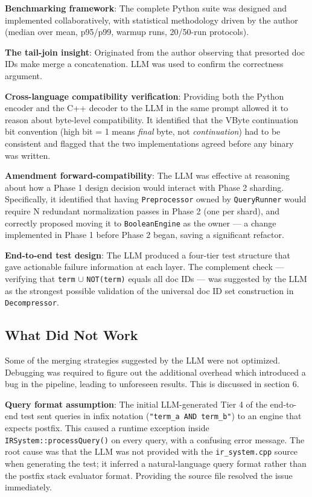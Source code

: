 \documentclass[twocolumn, 10pt]{article}
\begin{document}
\textbf{Benchmarking framework}: The complete Python suite was designed
and implemented collaboratively, with statistical methodology driven by the
author (median over mean, p95/p99, warmup runs, 20/50-run protocols).

\textbf{The tail-join insight}: Originated from the author observing that
presorted doc IDs make merge a concatenation. LLM was used to confirm the
correctness argument.

\textbf{Cross-language compatibility verification}: Providing both the
Python encoder and the C++ decoder to the LLM in the same prompt allowed it
to reason about byte-level compatibility. It identified that the VByte
continuation bit convention (high bit = 1 means \textit{final} byte, not
\textit{continuation}) had to be consistent and flagged that the two
implementations agreed before any binary was written.

\textbf{Amendment forward-compatibility}: The LLM was effective at
reasoning about how a Phase 1 design decision would interact with Phase 2
sharding. Specifically, it identified that having \texttt{Preprocessor}
owned by \texttt{QueryRunner} would require N redundant normalization passes
in Phase 2 (one per shard), and correctly proposed moving it to
\texttt{BooleanEngine} as the owner --- a change implemented in Phase 1
before Phase 2 began, saving a significant refactor.

\textbf{End-to-end test design}: The LLM produced a four-tier test
structure that gave actionable failure information at each layer. The
complement check --- verifying that \texttt{term} $\cup$
\texttt{NOT(term)} equals all doc IDs --- was suggested by the LLM as
the strongest possible validation of the universal doc ID set construction
in \texttt{Decompressor}.

\subsection{What Did Not Work}

Some of the merging strategies suggested by the LLM were not optimized.
Debugging was required to figure out the additional overhead which introduced
a bug in the pipeline, leading to unforeseen results. This is discussed in
section 6.

\textbf{Query format assumption}: The initial LLM-generated Tier 4 of the
end-to-end test sent queries in infix notation (\texttt{"term\_a AND term\_b"})
to an engine that expects postfix. This caused a runtime exception inside
\texttt{IRSystem::processQuery()} on every query, with a confusing error
message. The root cause was that the LLM was not provided with the
\texttt{ir\_system.cpp} source when generating the test; it inferred a
natural-language query format rather than the postfix stack evaluator
format. Providing the source file resolved the issue immediately.
\end{document}
